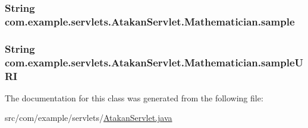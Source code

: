\subsubsection[{\texorpdfstring{sample}{sample}}]{\setlength{\rightskip}{0pt plus 5cm}String com.\+example.\+servlets.\+Atakan\+Servlet.\+Mathematician.\+sample}\hypertarget{classcom_1_1example_1_1servlets_1_1_atakan_servlet_1_1_mathematician_ae895437cf6140abf4afb34b0495cf5bf}{}\label{classcom_1_1example_1_1servlets_1_1_atakan_servlet_1_1_mathematician_ae895437cf6140abf4afb34b0495cf5bf}
\subsubsection[{\texorpdfstring{sample\+U\+RI}{sampleURI}}]{\setlength{\rightskip}{0pt plus 5cm}String com.\+example.\+servlets.\+Atakan\+Servlet.\+Mathematician.\+sample\+U\+RI}\hypertarget{classcom_1_1example_1_1servlets_1_1_atakan_servlet_1_1_mathematician_a117d588b1ebe1e50099a31ac3fa76d01}{}\label{classcom_1_1example_1_1servlets_1_1_atakan_servlet_1_1_mathematician_a117d588b1ebe1e50099a31ac3fa76d01}


The documentation for this class was generated from the following file\+:\begin{DoxyCompactItemize}
\item 
src/com/example/servlets/\hyperlink{_atakan_servlet_8java}{Atakan\+Servlet.\+java}\end{DoxyCompactItemize}
